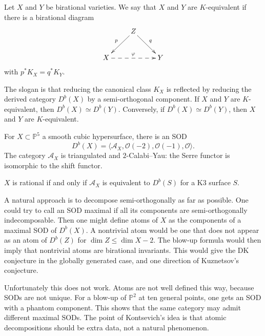 \begin{definition}
\label{definition-let-x2}
Let $X$ and $Y$ be birational
varieties.
We say that $X$ and $Y$ are
$K$-equivalent if there is a birational
diagram
\[
\xymatrix{
& Z \ar[dl]_p \ar[dr]^q \\
X \ar@{-->}[rr]^\varphi && Y
}
\]
with $p^*K_X=q^*K_Y$.
\end{definition}

\begin{remark}[Kawamata]
\label{remark-slogan-reducing}
The slogan is that reducing the
canonical class $K_X$ is reflected by
reducing the derived category
$D^b(X)$ by a semi-orthogonal
component.
If $X$ and $Y$ are $K$-equivalent,
then
$D^b(X)\simeq D^b(Y)$.
Conversely, if
$D^b(X)\simeq D^b(Y)$,
then $X$ and $Y$ are $K$-equivalent.
\end{remark}

\begin{example}
\label{example-x-p}
For $X\subset \mathbb P^5$ a smooth
cubic hypersurface, there is an SOD
\[
D^b(X)=\langle
\mathcal A_X,
\mathcal O(-2),\mathcal O(-1),
\mathcal O
\rangle.
\]
The category $\mathcal A_X$ is
triangulated and $2$-Calabi--Yau:
the Serre functor is isomorphic to
the shift functor.
\end{example}

\begin{remark}[Kuznetsov]
\label{remark-x-rational2}
$X$ is rational if and only if
$\mathcal A_X$ is equivalent to
$D^b(S)$ for a K3 surface $S$.
\end{remark}

\begin{remark}
\label{remark-natural-approach}
A natural approach is to decompose
semi-orthogonally as far as possible.
One could try to call an SOD maximal
if all its components are
semi-orthogonally indecomposable.
Then one might define atoms of $X$ as
the components of a maximal SOD of
$D^b(X)$.
A nontrivial atom would be one that
does not appear as an atom of
$D^b(Z)$ for
$\dim Z\leq \dim X-2$.
The blow-up formula would then imply
that nontrivial atoms are birational
invariants.
This would give the DK conjecture in
the globally generated case, and one
direction of Kuznetsov's conjecture.

Unfortunately this does not work.
Atoms are not well defined this way,
because SODs are not unique.
For a blow-up of $\mathbb P^2$ at
ten general points, one gets an SOD
with a phantom component.
This shows that the same category may
admit different maximal SODs.
The point of Kontsevich's idea is that
atomic decompositions should be extra
data, not a natural phenomenon.
\end{remark}

